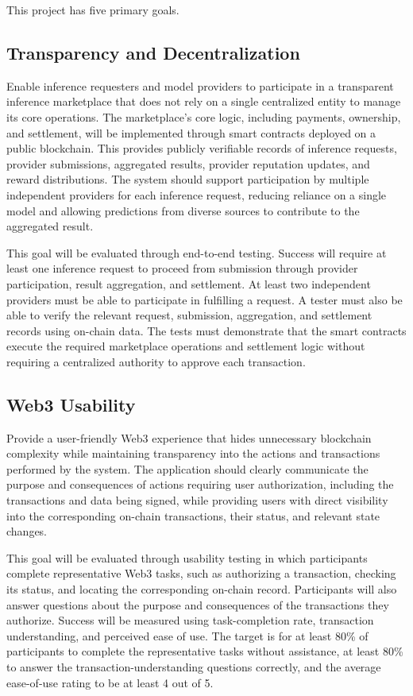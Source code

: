 \documentclass{article}
\begin{document}
This project has five primary goals.

\subsection{Transparency and Decentralization}

Enable inference requesters and model providers to participate in a
transparent inference marketplace that does not rely on a single
centralized entity to manage its core operations. The marketplace's
core logic, including payments, ownership, and settlement, will be
implemented through smart contracts deployed on a public blockchain.
This provides publicly verifiable records of inference requests,
provider submissions, aggregated results, provider reputation updates,
and reward distributions. The system should support participation by
multiple independent providers for each inference request, reducing
reliance on a single model and allowing predictions from diverse sources
to contribute to the aggregated result.

This goal will be evaluated through end-to-end testing. Success will
require at least one inference request to proceed from submission
through provider participation, result aggregation, and settlement.
At least two independent providers must be able to participate in
fulfilling a request. A tester must also be able to verify the relevant
request, submission, aggregation, and settlement records using
on-chain data. The tests must demonstrate that the smart contracts
execute the required marketplace operations and settlement logic
without requiring a centralized authority to approve each transaction.

\subsection{Web3 Usability}

Provide a user-friendly Web3 experience that hides unnecessary
blockchain complexity while maintaining transparency into the actions
and transactions performed by the system. The application should
clearly communicate the purpose and consequences of actions requiring
user authorization, including the transactions and data being signed,
while providing users with direct visibility into the corresponding
on-chain transactions, their status, and relevant state changes.

This goal will be evaluated through usability testing in which
participants complete representative Web3 tasks, such as authorizing
a transaction, checking its status, and locating the corresponding
on-chain record. Participants will also answer questions about the
purpose and consequences of the transactions they authorize.
Success will be measured using task-completion rate, transaction
understanding, and perceived ease of use. The target is for at least
80\% of participants to complete the representative tasks without
assistance, at least 80\% to answer the transaction-understanding
questions correctly, and the average ease-of-use rating to be at
least 4 out of 5.
\end{document}

